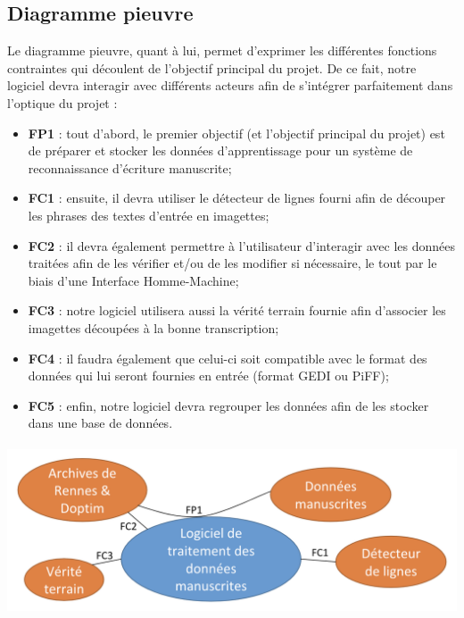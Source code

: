 \subsection{Diagramme pieuvre}

Le diagramme pieuvre, quant à lui, permet d’exprimer les différentes fonctions contraintes
qui découlent de l’objectif principal du projet. De ce fait, notre logiciel devra interagir
avec différents acteurs afin de s’intégrer parfaitement dans l’optique du projet :

\begin{itemize}
\item \textbf{FP1} : tout d’abord, le premier objectif (et l’objectif principal du projet) est
de préparer et stocker les données d’apprentissage pour un système de reconnaissance d’écriture manuscrite;
\item \textbf{FC1} : ensuite, il devra utiliser le détecteur de lignes fourni afin de découper
les phrases des textes d’entrée en imagettes;
\item \textbf{FC2} : il devra également permettre à l’utilisateur d’interagir avec les données
traitées afin de les vérifier et/ou de les modifier si nécessaire, le tout par le biais d’une Interface Homme-Machine;
\item \textbf{FC3} : notre logiciel utilisera aussi la vérité terrain fournie afin d’associer
les imagettes découpées à la bonne transcription;
\item \textbf{FC4} : il faudra également que celui-ci soit compatible avec le format des données
qui lui seront fournies en entrée (format GEDI ou PiFF);
\item \textbf{FC5} : enfin, notre logiciel devra regrouper les données afin de les stocker dans une base de données.
\end{itemize}

\paragraph{}
\begin{mdframed}[frametitle={Figure 7 : Diagramme pieuvre}, innerbottommargin=10]
\begin{center}
\includegraphics[width=0.7\linewidth]{pieuvre.png}
\end{center}
\end{mdframed}